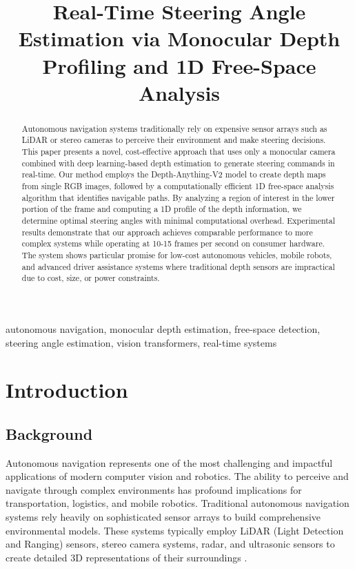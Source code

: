 \documentclass[conference]{IEEEtran}
\begin{document}
\title{Real-Time Steering Angle Estimation via Monocular Depth Profiling and 1D Free-Space Analysis}

\author{
}

\maketitle

\begin{abstract}
Autonomous navigation systems traditionally rely on expensive sensor arrays such as LiDAR or stereo cameras to perceive their environment and make steering decisions. This paper presents a novel, cost-effective approach that uses only a monocular camera combined with deep learning-based depth estimation to generate steering commands in real-time. Our method employs the Depth-Anything-V2 model to create depth maps from single RGB images, followed by a computationally efficient 1D free-space analysis algorithm that identifies navigable paths. By analyzing a region of interest in the lower portion of the frame and computing a 1D profile of the depth information, we determine optimal steering angles with minimal computational overhead. Experimental results demonstrate that our approach achieves comparable performance to more complex systems while operating at 10-15 frames per second on consumer hardware. The system shows particular promise for low-cost autonomous vehicles, mobile robots, and advanced driver assistance systems where traditional depth sensors are impractical due to cost, size, or power constraints.
\end{abstract}

\begin{IEEEkeywords}
autonomous navigation, monocular depth estimation, free-space detection, steering angle estimation, vision transformers, real-time systems
\end{IEEEkeywords}

\section{Introduction}

\subsection{Background}
Autonomous navigation represents one of the most challenging and impactful applications of modern computer vision and robotics. The ability to perceive and navigate through complex environments has profound implications for transportation, logistics, and mobile robotics. Traditional autonomous navigation systems rely heavily on sophisticated sensor arrays to build comprehensive environmental models. These systems typically employ LiDAR (Light Detection and Ranging) sensors, stereo camera systems, radar, and ultrasonic sensors to create detailed 3D representations of their surroundings \cite{b1}.
\end{document}
